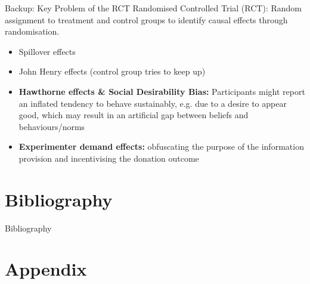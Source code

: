 \documentclass{beamer}
\begin{document}
\begin{frame}{Backup: Key Problem of the RCT}
    Randomised Controlled Trial (RCT): Random assignment to treatment and control groups to identify causal effects through randomisation.

    \medskip
    
    \begin{itemize}
    \setlength{\itemsep}{8pt}
        \item Spillover effects
        \item John Henry effects (control group tries to keep up)
        \item \textbf{Hawthorne effects \& Social Desirability Bias: }Participants might report an inﬂated tendency to behave sustainably, e.g. due to a desire to appear good, which may result in an artiﬁcial gap between beliefs and behaviours/norms
        \item \textbf{Experimenter demand effects: }obfuscating the purpose of the information provision and incentivising the donation outcome
    \end{itemize}
    
\end{frame}




\section*{Bibliography}
\begin{frame}[allowframebreaks]{Bibliography}
    \printbibliography
\end{frame}
    
\appendix
\section*{Appendix}
\end{document}
